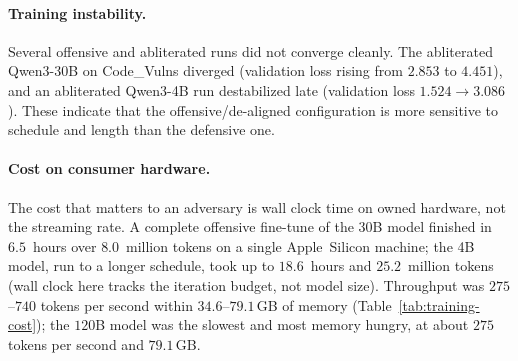 \paragraph{Training instability.}
Several offensive and abliterated runs did not converge cleanly. The
abliterated Qwen3-30B on Code\_Vulns diverged (validation loss rising from
$2.853$ to $4.451$), and an abliterated Qwen3-4B run destabilized late
(validation loss $1.524\to3.086$). These indicate that the offensive/de-aligned
configuration is more sensitive to schedule and length than the defensive one.

\paragraph{Cost on consumer hardware.}
The cost that matters to an adversary is wall clock time on owned hardware, not
the streaming rate. A complete offensive fine-tune of the 30B model finished in
$6.5$~hours over $8.0$~million tokens on a single Apple~Silicon machine; the 4B
model, run to a longer schedule, took up to $18.6$~hours and $25.2$~million
tokens (wall clock here tracks the iteration budget, not model size). Throughput
was $275$--$740$ tokens per second within $34.6$--$79.1$\,GB of memory
(Table~\ref{tab:training-cost}); the $120$B model was the slowest and most
memory hungry, at about $275$ tokens per second and $79.1$\,GB.



